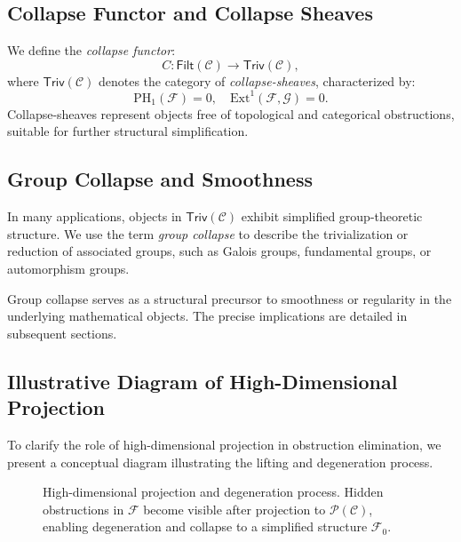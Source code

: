\documentclass[11pt]{article}
\begin{document}
\subsection{Collapse Functor and Collapse Sheaves}

We define the \emph{collapse functor}:
\[
C : \mathsf{Filt}(\mathcal{C}) \longrightarrow \mathsf{Triv}(\mathcal{C}),
\]
where $\mathsf{Triv}(\mathcal{C})$ denotes the category of \emph{collapse-sheaves}, characterized by:
\[
\mathrm{PH}_1(\mathcal{F}) = 0, \quad \mathrm{Ext}^1(\mathcal{F}, \mathcal{G}) = 0.
\]
Collapse-sheaves represent objects free of topological and categorical obstructions, suitable for further structural simplification.

\subsection{Group Collapse and Smoothness}

In many applications, objects in $\mathsf{Triv}(\mathcal{C})$ exhibit simplified group-theoretic structure. We use the term \emph{group collapse} to describe the trivialization or reduction of associated groups, such as Galois groups, fundamental groups, or automorphism groups.

Group collapse serves as a structural precursor to smoothness or regularity in the underlying mathematical objects. The precise implications are detailed in subsequent sections.


\subsection{Illustrative Diagram of High-Dimensional Projection}

To clarify the role of high-dimensional projection in obstruction elimination, we present a conceptual diagram illustrating the lifting and degeneration process.

\begin{figure}[h]
\centering
{}
\caption{High-dimensional projection and degeneration process. Hidden obstructions in $\mathcal{F}$ become visible after projection to $\mathcal{P}(\mathcal{C})$, enabling degeneration and collapse to a simplified structure $\mathcal{F}_0$.}
\label{fig:projection}
\end{figure}
\end{document}
